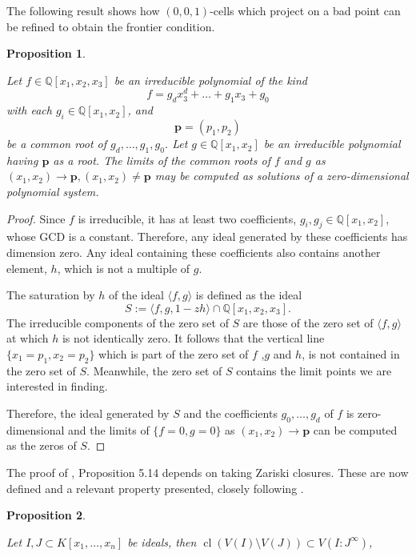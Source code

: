 \documentclass[
]{book}
\newtheorem{proposition}{Proposition}[chapter]
\theoremstyle{definition}
\theoremstyle{definition}
\theoremstyle{definition}
\theoremstyle{definition}
\theoremstyle{remark}
\begin{document}
The following result shows how \((0,0,1)\)-cells which project on a bad point can be refined to obtain the frontier condition.

\begin{proposition}
\protect\hypertarget{prp:lazard-5-14}{}\label{prp:lazard-5-14}\citep[Proposition 5.14]{lazard10}

Let \(f \in \mathbb{Q}[x_1,x_2,x_3]\) be an irreducible polynomial of the kind
\[f = g_dx_3^d + \ldots + g_1x_3 + g_0\]
with each \(g_i \in \mathbb{Q}[x_1,x_2]\), and
\[\mathbf{p} = (p_1,p_2)\]
be a common root of \(g_d,\ldots,g_1,g_0\).
Let \(g\in \mathbb{Q}[x_1,x_2]\) be an irreducible polynomial having \(\mathbf{p}\) as a root.
The limits of the common roots of \(f\) and \(g\) as \((x_1, x_2) \to \mathbf{p}, (x_1, x_2) \ne \mathbf{p}\) may be computed as solutions of a zero-dimensional
polynomial system.
\end{proposition}

\begin{proof}
Since \(f\) is irreducible, it has at least two coefficients, \(g_i,g_j \in \mathbb{Q}[x_1,x_2]\), whose GCD is a constant.
Therefore, any ideal generated by these coefficients has dimension zero. Any ideal containing these coefficients also contains another element, \(h\), which is not a multiple of \(g\).

The saturation by \(h\) of the ideal \(\langle f,g \rangle\) is defined as the ideal
\[
S := \langle f, g, 1 - zh \rangle \cap \mathbb{Q}[x_1,x_2,x_3].
\]
The irreducible components of the zero set of \(S\) are those of the zero set of \(\langle f,g \rangle\) at which \(h\) is not identically zero. It follows that the vertical line \(\{ x_1 = p_1, x_2 = p_2 \}\) which is part of the zero set of \(f\) ,\(g\) and \(h\), is not contained in the zero set of \(S\). Meanwhile, the zero set of \(S\) contains the limit points we are interested in finding.

Therefore, the ideal generated by \(S\) and the coefficients \(g_0,\ldots,g_d\) of \(f\) is zero-dimensional and the limits of \(\{ f=0,g=0 \}\) as \((x_1,x_2) \to \mathbf{p}\) can be computed as the zeros of \(S\).
\end{proof}

The proof of \citet{lazard10}, Proposition 5.14 depends on taking Zariski closures. These are now defined and a relevant property presented, closely following \citet{cox2013}.

\begin{proposition}
\protect\hypertarget{prp:cox-zariski}{}\label{prp:cox-zariski}\citep[ p203, part of Theorem 10]{cox2013}

Let \(I,J \subset K[x_1,\ldots,x_n]\) be ideals, then
\({\operatorname{cl} \left(  V(I) \setminus V(J)  \right)} \subset V(I : J^\infty)\),
\end{proposition}
\end{document}
